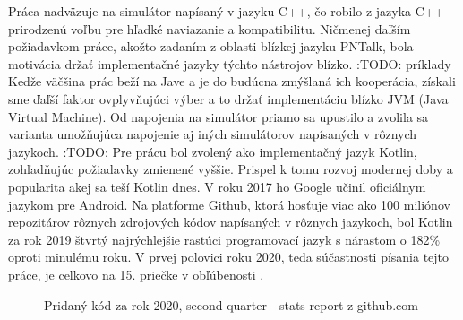 Práca nadväzuje na simulátor napísaný v jazyku C++, čo robilo z jazyka C++ prirodzenú voľbu pre hľadké naviazanie a kompatibilitu. Ničmenej ďaľším požiadavkom práce, akožto zadaním z oblasti blízkej jazyku PNTalk, bola motivácia držať implementačné jazyky týchto nástrojov blízko. :TODO: príklady Keďže väčšina prác beží na Jave a je do budúcna zmýšlaná ich kooperácia, získali sme ďaľší faktor ovplyvňujúci výber a to držať implementáciu blízko JVM (Java Virtual Machine). Od napojenia na simulátor priamo sa upustilo a zvolila sa varianta umožňujúca napojenie aj iných simulátorov napísaných v rôznych jazykoch. :TODO: Pre prácu bol zvolený ako implementačný jazyk Kotlin, zohľadňujúc požiadavky zmienené vyššie. Prispel k tomu rozvoj modernej doby a popularita akej sa teší Kotlin dnes. V roku 2017 ho Google učinil oficiálnym jazykom pre Android. \cite{tornadofx} Na platforme Github, ktorá hosťuje viac ako 100 miliónov repozitárov rôznych zdrojových kódov napísaných v rôznych jazykoch, bol Kotlin za rok 2019 štvrtý najrýchlejšie rastúci programovací jazyk s nárastom o 182\% oproti minulému roku. \cite{githuboctoverse}
V prvej polovici roku 2020, teda súčastnosti písania tejto práce, je celkovo na 15. priečke v obľúbenosti \cite{githubstats}.

\begin{figure} [H]
	\label{chart:githubuse}
	\centering
	\caption{Pridaný kód za rok 2020, second quarter - stats report z github.com \cite{githuboctoverse}}
\end{figure}

